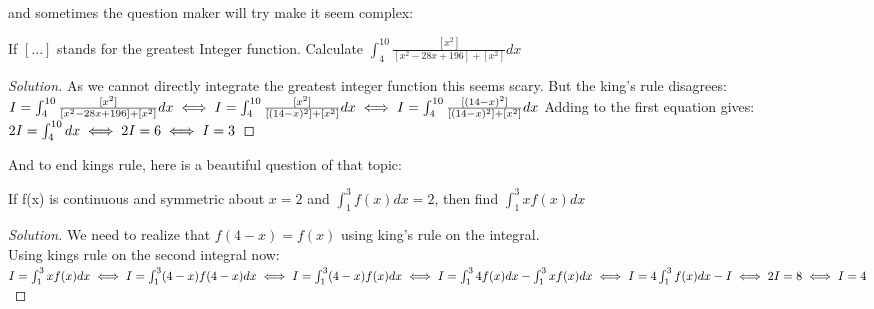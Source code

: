 and sometimes the question maker will try make it seem complex:\\
\begin{example}
    If $[...]$ stands for the greatest Integer function. Calculate $\int^{10}_4 \frac{[x^2]}{[x^2-28x+196]+[x^2]}dx$
\end{example}
\begin{proof}
    [Solution]
    As we cannot directly integrate the greatest integer function this seems scary. But the king's rule disagrees:\\
    $
    I = \int^{10}_4 \frac{[x^2]}{[x^2-28x+196]+[x^2]}dx\\
    \iff I=\int^{10}_4 \frac{[x^2]}{[(14-x)^2]+[x^2]}dx\\
    \iff I=\int^{10}_4 \frac{[(14-x)^2]}{[(14-x)^2]+[x^2]}dx\\
    $
    Adding to the first equation gives:\\
    $2I= \int^{10}_4 dx\\
    \iff 2I= 6\\
    \iff I =3$
\end{proof}
And to end kings rule, here is a beautiful question of that topic:\\
\begin{example}
    If f(x) is continuous and symmetric about $x=2$ and $\int^3_1 f(x)dx=2$, then find $\int^3_1xf(x)dx$
\end{example}
\begin{proof}
    [Solution]
    We need to realize that $f(4-x)=f(x)$ using king's rule on the integral.\\
    Using kings rule on the second integral now:\\
    $I= \int^3_1xf(x)dx\\
    \iff I = \int^3_1(4-x)f(4-x)dx
    \iff I = \int^3_1(4-x)f(x)dx
    \iff I = \int^3_1 4f(x)dx - \int^3_1xf(x)dx\\
    \iff I = 4\int^3_1 f(x)dx - I \\
    \iff 2I = 8\\
    \iff I = 4\\
    $
\end{proof}

